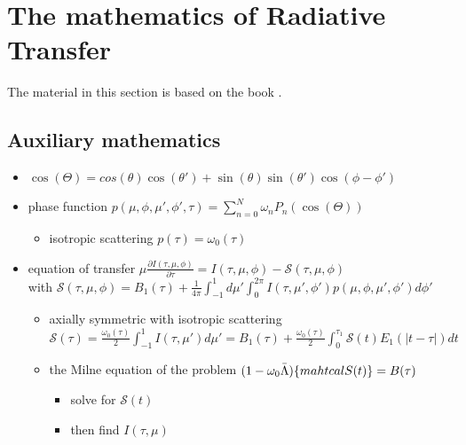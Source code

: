 \documentclass[../main/main.tex]{subfiles}
\begin{document}
\section{The mathematics of Radiative Transfer}
The material in this section is based on the book \cite{Busbridge}.

\subsection{Auxiliary mathematics}

\begin{itemize}
\item $\cos(\Theta) = cos(\theta)\cos(\theta') + \sin(\theta)\sin(\theta') \cos(\phi-\phi')$

\item phase function $\boxed{p(\mu,\phi,\mu',\phi',\tau) = \sum_{n=0}^N \omega_n P_n(\cos(\Theta))}$
\begin{itemize}

\item isotropic scattering $p(\tau) = \omega_0(\tau)$
\end{itemize}

\item equation of transfer $\boxed{\mu \frac{\partial I(\tau,\mu,\phi)}{\partial \tau} = I(\tau,\mu,\phi) - \mathcal{S}(\tau,\mu,\phi)}$ 
\\ with $\mathcal{S}(\tau,\mu,\phi) = B_1(\tau) + \frac{1}{4 \pi} \int_{-1}^{1} d\mu' \int_0^{2\pi} I(\tau,\mu',\phi') p(\mu,\phi,\mu',\phi') d\phi'$
\begin{itemize}
\item axially symmetric with isotropic scattering \\
$\mathcal{S}(\tau) = \frac{\omega_0(\tau)}{2} \int_{-1}^{1} I(\tau,\mu') d\mu' = 
B_1(\tau) + \frac{\omega_0(\tau)}{2} \int_0^{\tau_1} \mathcal{S} (t) E_1(|t-\tau|)dt $
\item the Milne equation of the problem $(1-\omega_0 \bar{\Lambda})\{ \\mahtcal{S}(t)\} = B(\tau)$
\begin{itemize}
\item solve for $\mathcal{S}(t)$
\item then find $I(\tau,\mu)$
\end{itemize}
\end{itemize}
\end{itemize}
\end{document}
